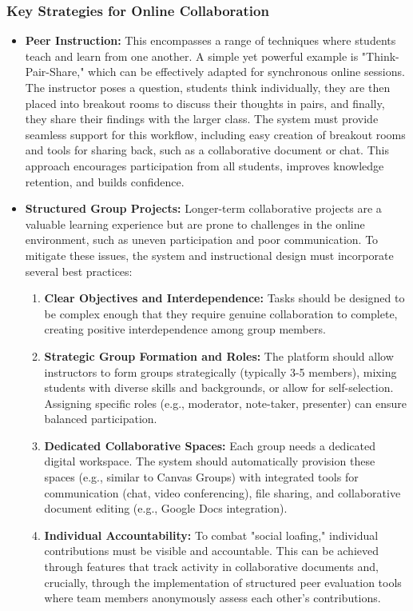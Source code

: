 \documentclass{article}
\begin{document}
\subsubsection{Key Strategies for Online Collaboration}

\begin{itemize}
    \item \textbf{Peer Instruction:} This encompasses a range of techniques where students teach and learn from one another. A simple yet powerful example is "Think-Pair-Share," which can be effectively adapted for synchronous online sessions. The instructor poses a question, students think individually, they are then placed into breakout rooms to discuss their thoughts in pairs, and finally, they share their findings with the larger class.\cite{47, 61} The system must provide seamless support for this workflow, including easy creation of breakout rooms and tools for sharing back, such as a collaborative document or chat. This approach encourages participation from all students, improves knowledge retention, and builds confidence.\cite{62}
    \item \textbf{Structured Group Projects:} Longer-term collaborative projects are a valuable learning experience but are prone to challenges in the online environment, such as uneven participation and poor communication.\cite{63} To mitigate these issues, the system and instructional design must incorporate several best practices:
    \begin{enumerate}
        \item \textbf{Clear Objectives and Interdependence:} Tasks should be designed to be complex enough that they require genuine collaboration to complete, creating positive interdependence among group members.\cite{64}
        \item \textbf{Strategic Group Formation and Roles:} The platform should allow instructors to form groups strategically (typically 3-5 members), mixing students with diverse skills and backgrounds, or allow for self-selection.\cite{59, 65} Assigning specific roles (e.g., moderator, note-taker, presenter) can ensure balanced participation.\cite{48, 58}
        \item \textbf{Dedicated Collaborative Spaces:} Each group needs a dedicated digital workspace. The system should automatically provision these spaces (e.g., similar to Canvas Groups) with integrated tools for communication (chat, video conferencing), file sharing, and collaborative document editing (e.g., Google Docs integration).\cite{64, 65}
        \item \textbf{Individual Accountability:} To combat "social loafing," individual contributions must be visible and accountable. This can be achieved through features that track activity in collaborative documents and, crucially, through the implementation of structured peer evaluation tools where team members anonymously assess each other's contributions.\cite{59, 65, 66}
    \end{enumerate}
\end{itemize}
\end{document}
